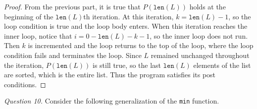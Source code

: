 \documentclass[11pt]{article}
\begin{document}
\begin{enumerate}[label=(\alph*)]
\begin{proof}
            From the previous part, it is true that \(P(\texttt{len}(L))\) holds at the beginning of the \(\texttt{len}(L)\)th iteration. At this iteration, \(k=\texttt{len}(L) - 1\), so the loop condition is true and the loop body enters. When this iteration reaches the inner loop, notice that \(i = 0 - \texttt{len}(L) - k - 1\), so the inner loop does not run. Then \(k\) is incremented and the loop returns to the top of the loop, where the loop condition fails and terminates the loop. Since \(L\) remained unchanged throughout the iteration, \(P(\texttt{len}(L))\) is still true, so the last \(\texttt{len}(L)\) elements of the list are sorted, which is the entire list. Thus the program satisfies its post conditions.
        \end{proof}
    \end{enumerate}
    \textit{Question 10.} Consider the following generalization of the \verb|min| function.
\end{document}
